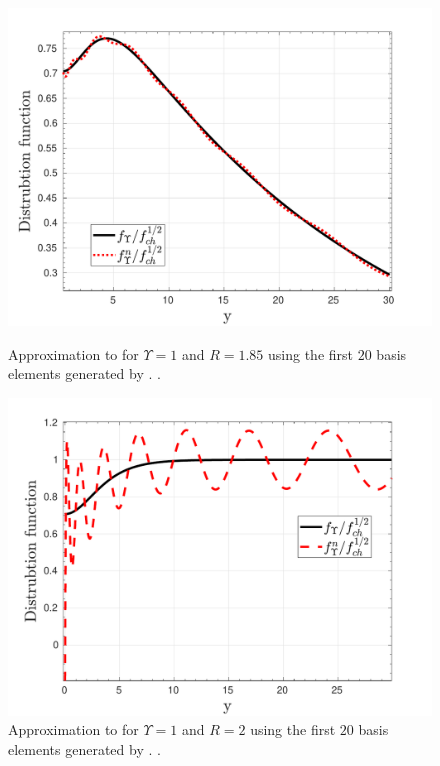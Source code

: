 \begin{figure}[ht]
\centerline{\includegraphics[width=0.8\linewidth]{06-appendix/SpectralMethodBoltzmann/Figures/free_stream_f0_approx_Ups_1_T_r_1_85_n_20.pdf}}
\caption{Approximation to  for $\Upsilon=1$ and $R=1.85$ using the first $20$ basis elements generated by . .}\label{fig:free_stream_f0_approx_Ups_1_T_r_1_85}
 \centerline{\includegraphics[width=0.8\linewidth]{06-appendix/SpectralMethodBoltzmann/Figures/free_stream_f0_approx_Ups_1_T_r_2_n_20.pdf}}
\caption{Approximation to  for $\Upsilon=1$ and $R=2$ using the first $20$ basis elements generated by . .}\label{fig:free_stream_f0_approx_Ups_1_T_r_2}
\end{figure}

